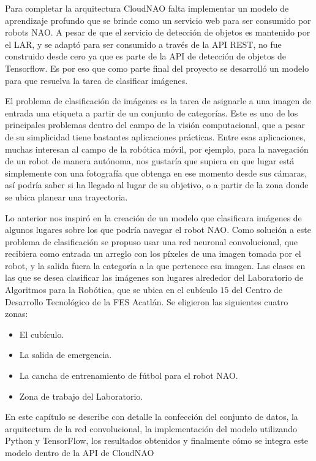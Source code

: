 %
%

Para completar la arquitectura CloudNAO falta implementar un modelo de aprendizaje 
profundo que se brinde como un servicio web para ser consumido por robots NAO.
A pesar de que el servicio de detección de objetos es mantenido por el LAR, y 
se adaptó para ser consumido a través de la API REST, no fue construido
desde cero ya que es parte de la API de detección de objetos de Tensorflow.
Es por eso que como parte final del proyecto se desarrolló un modelo para que 
resuelva la tarea de clasificar imágenes.

El problema de clasificación de imágenes es la tarea de asignarle a una imagen de
entrada una etiqueta a partir de un conjunto de categorías. Este es uno de los principales
problemas dentro del campo de la visión computacional, que a pesar de su simplicidad
tiene bastantes aplicaciones prácticas. Entre esas aplicaciones, muchas interesan al
campo de la robótica móvil, por ejemplo, para la navegación de un robot de manera
autónoma, nos gustaría que supiera en que lugar está simplemente con una fotografía
que obtenga en ese momento desde sus cámaras, así podría saber si ha llegado al 
lugar de su objetivo, o a partir de la zona donde se ubica planear una trayectoria.

Lo anterior nos inspiró en la creación de un modelo que clasificara imágenes
de algunos lugares sobre los que podría navegar el robot NAO. 
Como solución a este problema de clasificación se propuso usar 
una red neuronal convolucional, que recibiera como entrada un arreglo con los
píxeles de una imagen tomada por el robot, y la salida fuera la categoría
a la que pertenece esa imagen. 
Las clases en las que se desea clasificar las imágenes son lugares alrededor
del Laboratorio de Algoritmos para la Robótica, que se ubica en el cubículo $15$ del
Centro de Desarrollo Tecnológico de la FES Acatlán. Se eligieron las siguientes cuatro zonas:

\begin{itemize}
    \item El cubículo.
    \item La salida de emergencia.
    \item La cancha de entrenamiento de fútbol para el robot NAO.
    \item Zona de trabajo del Laboratorio.
\end{itemize}


En este capítulo se describe con detalle la confección del
conjunto de datos, la arquitectura de la red 
convolucional, la implementación
del modelo utilizando Python y TensorFlow, los resultados obtenidos
y finalmente cómo se integra este modelo dentro de la API de CloudNAO 

%
%